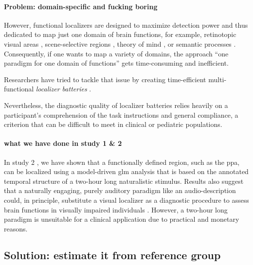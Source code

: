 \paragraph{Problem: domain-specific and fucking boring}

However, functional localizers are designed to maximize detection power and thus
dedicated to map just one domain of brain functions, for example, retinotopic
visual areas \citep{wang2015probabilistic}, scene-selective regions
\citep{stigliani2015temporal}, theory of mind \citep{spunt2014validating}, or
semantic processes \citep{fernandez2001language}.
Consequently, if one wants to map a variety of domains, the approach ``one
paradigm for one domain of functions'' gets time-consuming and inefficient.


Researchers have tried to tackle that issue by creating time-efficient
multi-functional \textit{localizer batteries} \citep[e.g.,][]{barch2013function,
drobyshevsky2006rapid, pinel2007fast}.

Nevertheless, the diagnostic quality of localizer batteries relies heavily on
a participant's comprehension of the task instructions and general compliance,
a criterion that can be difficult to meet in clinical or pediatric populations.



\paragraph{what we have done in study 1 \& 2}

%
In study 2 \citep{haeusler2022processing}, we have shown that a functionally
defined region, such as the \ac{ppa}, can be localized using a model-driven
\ac{glm} analysis that is based on the annotated temporal structure of a
two-hour long naturalistic stimulus.
%
Results also suggest that a naturally engaging, purely auditory paradigm like an
audio-description could, in principle, substitute a visual localizer as a
diagnostic procedure to assess brain functions in visually impaired individuals
\citep{haeusler2022processing}.
%
However, a two-hour long paradigm is unsuitable for a clinical application due
to practical and monetary reasons.


\subsection{Solution: estimate it from reference group}

